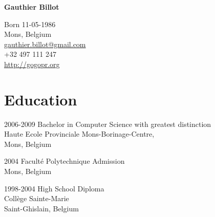 \documentclass[11pt,letterpaper]{report}
\newcommand{\myname}{Gauthier Billot}
\newcommand{\namefont}[1]{{\normalfont\bfseries\Huge{#1}}}
\begin{document}

    \raggedright{}

    \namefont{\myname}


    \vspace{1em}
    \begin{minipage}[t]{0.700\textwidth}
        Born 11-05-1986 \\
        Mons, Belgium \\
        \href{mailto:gauthier.billot@gmail.com}{gauthier.billot@gmail.com} \\
        +32 497 111 247 \\
        \href{http://gogopr.org}{http://gogopr.org}
    \end{minipage}


    \section*{Education}

    \begin{tablist}

        \item[2006-2009]  \tab{}Bachelor in Computer Science with greatest distinction\\
                                  Haute Ecole Provinciale Mons-Borinage-Centre,\\
                                  Mons, Belgium
        \item[2004]     \tab{}Faculté Polytechnique Admission\\
                              Mons, Belgium
        \item[1998-2004]  \tab{}High School Diploma \\
                                  Collège Sainte-Marie \\
                                  Saint-Ghislain, Belgium

    \end{tablist}
\end{document}

